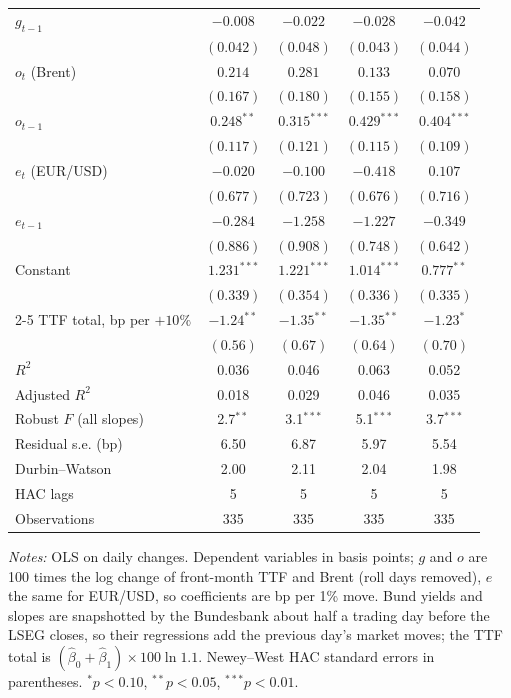 \documentclass[11pt,a4paper]{article}
\begin{document}
\begin{table}[htbp]
\begin{tabular}{@{}l*{4}{c}@{}}
$g_{t-1}$ & $-0.008$ & $-0.022$ & $-0.028$ & $-0.042$\\
 & $(0.042)$ & $(0.048)$ & $(0.043)$ & $(0.044)$\\
$o_t$ (Brent) & $0.214$ & $0.281$ & $0.133$ & $0.070$\\
 & $(0.167)$ & $(0.180)$ & $(0.155)$ & $(0.158)$\\
$o_{t-1}$ & $0.248^{**}$ & $0.315^{***}$ & $0.429^{***}$ & $0.404^{***}$\\
 & $(0.117)$ & $(0.121)$ & $(0.115)$ & $(0.109)$\\
$e_t$ (EUR/USD) & $-0.020$ & $-0.100$ & $-0.418$ & $0.107$\\
 & $(0.677)$ & $(0.723)$ & $(0.676)$ & $(0.716)$\\
$e_{t-1}$ & $-0.284$ & $-1.258$ & $-1.227$ & $-0.349$\\
 & $(0.886)$ & $(0.908)$ & $(0.748)$ & $(0.642)$\\
Constant & $1.231^{***}$ & $1.221^{***}$ & $1.014^{***}$ & $0.777^{**}$\\
 & $(0.339)$ & $(0.354)$ & $(0.336)$ & $(0.335)$\\
\cmidrule(l){2-5}
TTF total, bp per $+10\%$ & $-1.24^{**}$ & $-1.35^{**}$ & $-1.35^{**}$ & $-1.23^{*}$\\
 & $(0.56)$ & $(0.67)$ & $(0.64)$ & $(0.70)$\\
$R^2$ & 0.036 & 0.046 & 0.063 & 0.052\\
Adjusted $R^2$ & 0.018 & 0.029 & 0.046 & 0.035\\
Robust $F$ (all slopes) & 2.7$^{**}$ & 3.1$^{***}$ & 5.1$^{***}$ & 3.7$^{***}$\\
Residual s.e. (bp) & 6.50 & 6.87 & 5.97 & 5.54\\
Durbin--Watson & 2.00 & 2.11 & 2.04 & 1.98\\
HAC lags & 5 & 5 & 5 & 5\\
Observations & 335 & 335 & 335 & 335\\
\bottomrule
\end{tabular}
\par\vspace{4pt}\begin{minipage}{0.94\textwidth}\scriptsize\textit{Notes:} OLS on daily changes. Dependent variables in basis points; $g$ and $o$ are 100 times the log change of front-month TTF and Brent (roll days removed), $e$ the same for EUR/USD, so coefficients are bp per 1\% move. Bund yields and slopes are snapshotted by the Bundesbank about half a trading day before the LSEG closes, so their regressions add the previous day's market moves; the TTF total is $(\hat\beta_0+\hat\beta_1)\times 100\ln 1.1$. Newey--West HAC standard errors in parentheses. $^{*}p<0.10$, $^{**}p<0.05$, $^{***}p<0.01$.\end{minipage}
\end{table}
\end{document}
